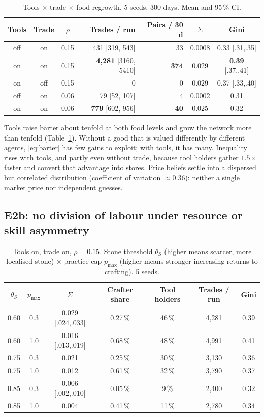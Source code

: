 \documentclass[11pt]{article}
\theoremstyle{definition}
\newcommand{\1}{\mathbf{1}}
\begin{document}
\begin{table}[h]
\centering\small
\caption{Tools $\times$ trade $\times$ food regrowth, 5 seeds, 300 days. Mean and 95\,\% CI.}
\label{tab:tools}
\begin{tabular}{cccrrcc}
\toprule
Tools & Trade & $\rho$ & Trades / run & Pairs / 30 d & $\Sigma$ & Gini\\
\midrule
off & on & 0.15 & 431 {\scriptsize[319, 543]} & 33 & 0.0008 & 0.33 {\scriptsize[.31,.35]}\\
on & on & 0.15 & \textbf{4{,}281} {\scriptsize[3160, 5410]} & \textbf{374} & 0.029 & \textbf{0.39} {\scriptsize[.37,.41]}\\
on & off & 0.15 & 0 & 0 & 0.029 & 0.37 {\scriptsize[.33,.40]}\\
off & on & 0.06 & 79 {\scriptsize[52, 107]} & 4 & 0.0002 & 0.31\\
on & on & 0.06 & \textbf{779} {\scriptsize[602, 956]} & \textbf{40} & 0.025 & 0.32\\
\bottomrule
\end{tabular}
\end{table}

Tools raise barter about tenfold at both food levels and grow the network more than tenfold (Table~\ref{tab:tools}). Without a good that is valued differently by different agents, \eqref{eq:barter} has few gains to exploit; with tools, it has many. Inequality rises with tools, and partly even without trade, because tool holders gather $1.5\times$ faster and convert that advantage into stores. Price beliefs settle into a dispersed but correlated distribution (coefficient of variation $\approx0.36$): neither a single market price nor independent guesses.

\subsection{E2b: no division of labour under resource or skill asymmetry}

\begin{table}[h]
\centering\small
\caption{Tools on, trade on, $\rho=0.15$. Stone threshold $\theta_S$ (higher means scarcer, more localised stone) $\times$ practice cap $p_{\max}$ (higher means stronger increasing returns to crafting). 5 seeds.}
\label{tab:spec}
\begin{tabular}{ccccccc}
\toprule
$\theta_S$ & $p_{\max}$ & $\Sigma$ & Crafter share & Tool holders & Trades / run & Gini\\
\midrule
0.60 & 0.3 & 0.029 {\scriptsize[.024,.033]} & 0.27\,\% & 46\,\% & 4{,}281 & 0.39\\
0.60 & 1.0 & 0.016 {\scriptsize[.013,.019]} & 0.68\,\% & 48\,\% & 4{,}991 & 0.41\\
0.75 & 0.3 & 0.021 & 0.25\,\% & 30\,\% & 3{,}130 & 0.36\\
0.75 & 1.0 & 0.012 & 0.61\,\% & 32\,\% & 3{,}790 & 0.37\\
0.85 & 0.3 & 0.006 {\scriptsize[.002,.010]} & 0.05\,\% & 9\,\% & 2{,}400 & 0.32\\
0.85 & 1.0 & 0.004 & 0.41\,\% & 11\,\% & 2{,}780 & 0.34\\
\bottomrule
\end{tabular}
\end{table}
\end{document}
